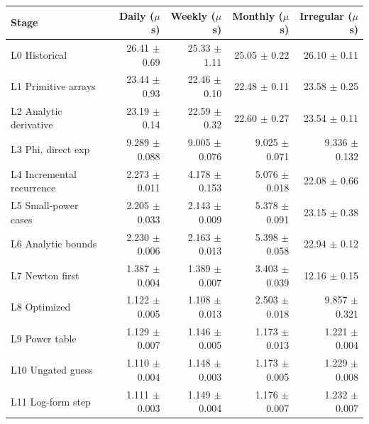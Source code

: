 \begin{tabular}{lrrrr}
\toprule
Stage & Daily ($\mu$s) & Weekly ($\mu$s) & Monthly ($\mu$s) & Irregular ($\mu$s) \\
\midrule
L0 Historical & 26.41 $\pm$ 0.69 & 25.33 $\pm$ 1.11 & 25.05 $\pm$ 0.22 & 26.10 $\pm$ 0.11 \\
L1 Primitive arrays & 23.44 $\pm$ 0.93 & 22.46 $\pm$ 0.10 & 22.48 $\pm$ 0.11 & 23.58 $\pm$ 0.25 \\
L2 Analytic derivative & 23.19 $\pm$ 0.14 & 22.59 $\pm$ 0.32 & 22.60 $\pm$ 0.27 & 23.54 $\pm$ 0.11 \\
L3 Phi, direct exp & 9.289 $\pm$ 0.088 & 9.005 $\pm$ 0.076 & 9.025 $\pm$ 0.071 & 9.336 $\pm$ 0.132 \\
L4 Incremental recurrence & 2.273 $\pm$ 0.011 & 4.178 $\pm$ 0.153 & 5.076 $\pm$ 0.018 & 22.08 $\pm$ 0.66 \\
L5 Small-power cases & 2.205 $\pm$ 0.033 & 2.143 $\pm$ 0.009 & 5.378 $\pm$ 0.091 & 23.15 $\pm$ 0.38 \\
L6 Analytic bounds & 2.230 $\pm$ 0.006 & 2.163 $\pm$ 0.013 & 5.398 $\pm$ 0.058 & 22.94 $\pm$ 0.12 \\
L7 Newton first & 1.387 $\pm$ 0.004 & 1.389 $\pm$ 0.007 & 3.403 $\pm$ 0.039 & 12.16 $\pm$ 0.15 \\
L8 Optimized & 1.122 $\pm$ 0.005 & 1.108 $\pm$ 0.013 & 2.503 $\pm$ 0.018 & 9.857 $\pm$ 0.321 \\
L9 Power table & 1.129 $\pm$ 0.007 & 1.146 $\pm$ 0.005 & 1.173 $\pm$ 0.013 & 1.221 $\pm$ 0.004 \\
L10 Ungated guess & 1.110 $\pm$ 0.004 & 1.148 $\pm$ 0.003 & 1.173 $\pm$ 0.005 & 1.229 $\pm$ 0.008 \\
L11 Log-form step & 1.111 $\pm$ 0.003 & 1.149 $\pm$ 0.004 & 1.176 $\pm$ 0.007 & 1.232 $\pm$ 0.007 \\
\bottomrule
\end{tabular}
